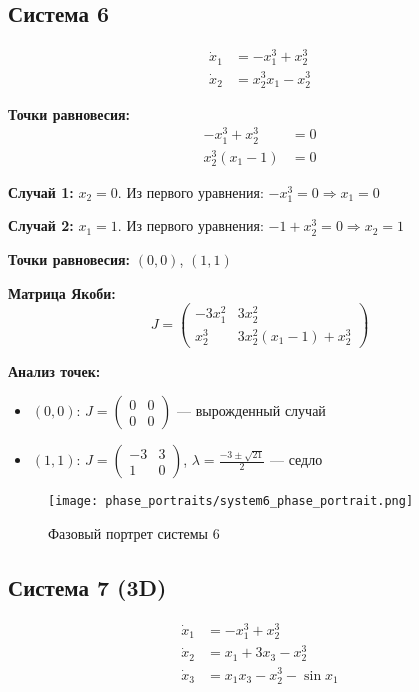 \subsection*{Система 6}

\begin{align}
\dot{x}_1 &= -x_1^3 + x_2^3 \\
\dot{x}_2 &= x_2^3 x_1 - x_2^3
\end{align}

\textbf{Точки равновесия:}
\begin{align}
-x_1^3 + x_2^3 &= 0 \\
x_2^3(x_1 - 1) &= 0
\end{align}

\textbf{Случай 1:} $x_2 = 0$. Из первого уравнения: $-x_1^3 = 0 \Rightarrow x_1 = 0$

\textbf{Случай 2:} $x_1 = 1$. Из первого уравнения: $-1 + x_2^3 = 0 \Rightarrow x_2 = 1$

\textbf{Точки равновесия:} $(0, 0)$, $(1, 1)$

\textbf{Матрица Якоби:}
$$J = \begin{pmatrix} -3x_1^2 & 3x_2^2 \\ x_2^3 & 3x_2^2(x_1 - 1) + x_2^3 \end{pmatrix}$$

\textbf{Анализ точек:}
\begin{itemize}
\item $(0, 0)$: $J = \begin{pmatrix} 0 & 0 \\ 0 & 0 \end{pmatrix}$ --- вырожденный случай
\item $(1, 1)$: $J = \begin{pmatrix} -3 & 3 \\ 1 & 0 \end{pmatrix}$, $\lambda = \frac{-3 \pm \sqrt{21}}{2}$ --- седло
\end{itemize}

\begin{figure}[H]
\centering
\texttt{[image: phase\_portraits/system6\_phase\_portrait.png]}
\caption{Фазовый портрет системы 6}
\label{fig:system6_phase_portrait}
\end{figure}

\subsection*{Система 7 (3D)}

\begin{align}
\dot{x}_1 &= -x_1^3 + x_2^3 \\
\dot{x}_2 &= x_1 + 3x_3 - x_2^3 \\
\dot{x}_3 &= x_1 x_3 - x_2^3 - \sin x_1
\end{align}

